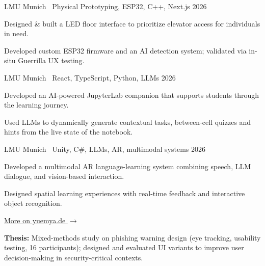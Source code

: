 \documentclass[10pt]{article}
\begin{document}
%
  {LMU Munich \textbullet\ Physical Prototyping, ESP32, C++, Next.js}%
  {2026}
\begin{cvitems}
  \item Designed \& built a LED floor interface to prioritize elevator access for individuals in need.
  \item Developed custom ESP32 firmware and an AI detection system; validated via in-situ Guerrilla UX testing.
\end{cvitems}

%
  {LMU Munich \textbullet\ React, TypeScript, Python, LLMs}%
  {2026}
\begin{cvitems}
  \item Developed an AI-powered JupyterLab companion that supports
        students through the learning journey.
  \item Used LLMs to dynamically generate contextual tasks,
        between-cell quizzes and hints from the live
        state of the notebook.
\end{cvitems}

%
  {LMU Munich \textbullet\ Unity, C\#, LLMs, AR, multimodal systems}%
  {2026}
\begin{cvitems}
  \item Developed a multimodal AR language-learning system combining speech,
        LLM dialogue, and vision-based interaction.
  \item Designed spatial learning experiences with real-time feedback and
        interactive object recognition.
\end{cvitems}

\vspace{0.3em}
\href{https://yuemya.de}{\textcolor{accent}{More on yuemya.de $\rightarrow$}}



\begin{cvitems}
  \item \textbf{Thesis:} Mixed-methods study on phishing warning design
        (eye tracking, usability testing, 16 participants); designed and
        evaluated UI variants to improve user decision-making in
        security-critical contexts.
\end{cvitems}

\end{document}
